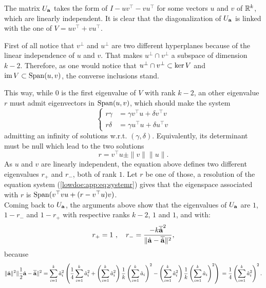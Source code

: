 The matrix $U_{\mathbf{a}}$ takes the form of $I-uv^{\top}-vu^{\top}$ for some vectors $u$ and $v$ of $\mathbb{R}^k$, which are linearly independent. It is clear that the diagonalization of $U_{\mathbf{a}}$ is linked with the one of $V=uv^{\top}+vu^{\top}$.

First of all notice that $v^\perp$ and $u^\perp$ are two different hyperplanes because of the linear independence of $u$ and $v$. That makes $u^\perp\cap v^\perp$ a subspace of dimension $k-2$. %
Therefore, as one would notice that $u^\perp\cap v^\perp\subset\operatorname{ker} V$ and $\operatorname{im} V\subset\operatorname{Span}(u,v)$, the converse inclusions stand.

This way, while $0$ is the first eigenvalue of $V$ with rank $k-2$, an other eigenvalue $r$ must admit eigenvectors in $\operatorname{Span}(u,v)$, which should make the system
    \begin{equation}\label{lowdoe:app:eq:systemr}
        \left\{\begin{array}{rl}
             r\gamma &= \gamma v^{\top}u+\delta v^{\top}v  \\
             r\delta &= \gamma u^{\top}u + \delta u^{\top}v 
        \end{array}  \right.
    \end{equation}
admitting an infinity of solutions w.r.t.{ }$(\gamma,\delta)$. Equivalently, its determinant must be null which lead to the two solutions 
    \begin{equation}
        r = v^{\top}u \pm \|v\|\|u\|.
    \end{equation}
As $u$ and $v$ are linearly independent, the equation above defines two different eigenvalues $r_+$ and $r_-$, both of rank $1$.
Let $r$ be one of those, a resolution of the equation system  (\ref{lowdoe:app:eq:systemr}) gives that the eigenspace associated with $r$ is $\operatorname{Span}(v^{\top}vu+(r-v^{\top}u)v)$.\\

Coming back to $U_{\mathbf{a}}$, the arguments above show that the eigenvalues of $U_{\mathbf{a}}$ are $1$, $1-r_-$ and $1-r_+$ with respective ranks $k-2$, $1$ and $1$, and with:
\begin{equation}
    r_+ = 1 \ ,\quad r_- = \frac{- k\overline{\hat{\mathbf{a}}}^2}{\|\hat{\mathbf{a}}-\overline{\hat{\mathbf{a}}} \|^2},
\end{equation}
because 
\begin{equation}
    \|\hatmbf a\|^2\|\frac{1}{2}\hatmbf a - \overline{\hatmbf a} \|^2  = \sum_{i=1}^k\hat a_i^2
    \left(\frac{1}{4}\sum_{i=1}^k\hat a_i^2 + \left(\sum_{i=1}^k\hat a_i^2\right)\frac{1}{k}\left(\sum_{i=1}^k\hat a_i\right)^2 - \left(\sum_{i=1}^k\hat a_i^2\right)\frac{1}{k}\left(\sum_{i=1}^k\hat a_i \right)^2 \right)\\
        = \frac{1}{4}\left(\sum_{i=1}^k\hat a_i^2\right)^2. %
\end{equation}

